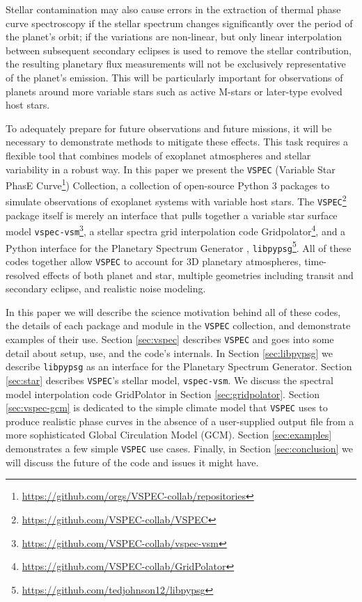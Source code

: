 \documentclass[twocolumn,linenumbers]{aastex631}
\newcommand{\vspec}[1]{\texttt{VSPEC}#1}
\begin{document}
Stellar contamination may also cause errors in the extraction of thermal phase curve spectroscopy if the stellar spectrum changes significantly over the period of the planet's orbit; if the variations are non-linear, but only linear interpolation between subsequent secondary eclipses is used to remove the stellar contribution, the resulting planetary flux measurements will not be exclusively representative of the planet's emission. This will be particularly important for observations of planets around more variable stars such as active M-stars or later-type evolved host stars. %

To adequately prepare for future observations and future missions, it will be necessary to demonstrate methods to mitigate these effects. This task requires a flexible tool that combines models of exoplanet atmospheres and stellar variability in a robust way. In this paper we present the \vspec{} (Variable Star PhasE Curve\footnote{\url{https://github.com/orgs/VSPEC-collab/repositories}}) Collection, a collection of open-source Python 3 packages to simulate observations of exoplanet systems with variable host stars. The \vspec{}\footnote{\url{https://github.com/VSPEC-collab/VSPEC}} package itself is merely an interface that pulls together a variable star surface model \texttt{vspec-vsm}\footnote{\url{https://github.com/VSPEC-collab/vspec-vsm}}, a stellar spectra grid interpolation code Gridpolator\footnote{\url{https://github.com/VSPEC-collab/GridPolator}}, and a Python interface for the Planetary Spectrum Generator \citep[PSG,][]{villanueva2018}, \texttt{libpypsg}\footnote{\url{https://github.com/tedjohnson12/libpypsg}}. All of these codes together allow \vspec{} to account for 3D planetary atmospheres, time-resolved effects of both planet and star, multiple geometries including transit and secondary eclipse, and realistic noise modeling.

In this paper we will describe the science motivation behind all of these codes, the details of each package and module in the \vspec{} collection, and demonstrate examples of their use. Section \ref{sec:vspec} describes \vspec{} and goes into some detail about setup, use, and the code's internals. In Section \ref{sec:libpypsg} we describe \texttt{libpypsg} as an interface for the Planetary Spectrum Generator. Section \ref{sec:star} describes \vspec{}'s stellar model, \texttt{vspec-vsm}. We discuss the spectral model interpolation code GridPolator in Section \ref{sec:gridpolator}. Section \ref{sec:vspec-gcm} is dedicated to the simple climate model that \vspec{} uses to produce realistic phase curves in the absence of a user-supplied output file from a more sophisticated Global Circulation Model (GCM). Section \ref{sec:examples} demonstrates a few simple \vspec{} use cases. Finally, in Section \ref{sec:conclusion} we will discuss the future of the code and issues it might have.
\end{document}
